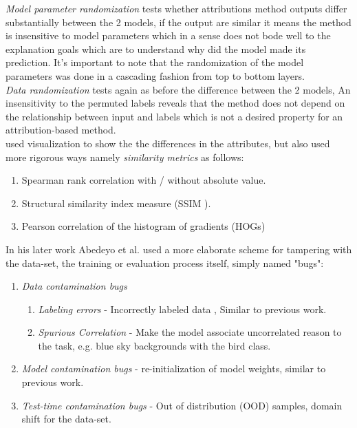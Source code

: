 \documentclass[12pt]{report}
\begin{document}
\textit{Model parameter randomization} tests whether attributions method outputs differ substantially between the 2 models, if the output are similar it means the method is insensitive to model parameters which in a sense does not bode well to the explanation goals which are to understand why did the model made its prediction. It's important to note that the randomization of the model parameters was done in a cascading fashion from top to bottom layers. \\

\textit{Data randomization} tests again as before the difference between the 2 models, An insensitivity to the permuted labels reveals that the method does not depend on the relationship between input and labels which is not a desired property for an attribution-based method. \\

\cite{https://doi.org/10.48550/arxiv.1810.03292} used visualization to show the the differences in the attributes, but also used more rigorous ways namely \textit{similarity metrics} as follows:
\begin{enumerate}
	\item Spearman rank correlation with / without  absolute value.
	\item Structural similarity index measure (SSIM \cite{1284395}).
	\item Pearson correlation of the histogram of gradients (HOGs)
\end{enumerate}

In his later work Abedeyo et al. \cite{DBLP:journals/corr/abs-2011-05429} used a more elaborate scheme for tampering with the data-set, the training or evaluation process itself, simply named "bugs":
\begin{enumerate}
	\item \textit{Data contamination bugs} 
	\begin{enumerate}
		\item \textit{Labeling errors} - Incorrectly labeled data , Similar to previous work.
		\item \textit{Spurious Correlation} - Make the model associate uncorrelated reason to the task, e.g. blue sky backgrounds with the bird class. 
	\end{enumerate}
	\item \textit{Model contamination bugs} - re-initialization of model weights, similar to previous work.
	\item \textit{Test-time contamination bugs} - Out of distribution (OOD) samples, domain shift for the data-set. 
\end{enumerate}
\end{document}
